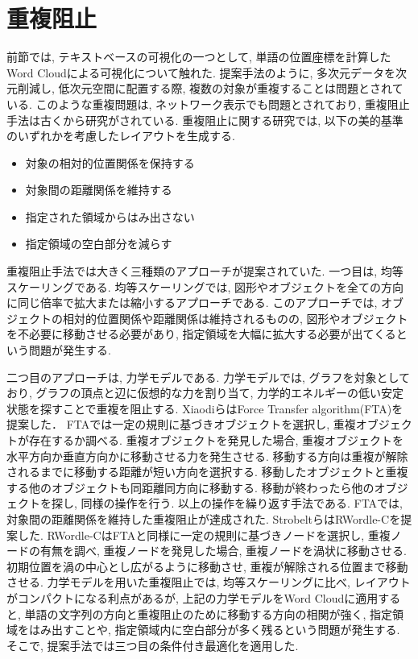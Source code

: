 \documentclass[syuuron]{kuee}
\begin{document}
	\section{重複阻止}
		前節では, テキストベースの可視化の一つとして, 単語の位置座標を計算したWord Cloudによる可視化について触れた. 
		提案手法のように, 多次元データを次元削減し, 低次元空間に配置する際, 複数の対象が重複することは問題とされている. 
		このような重複問題は, ネットワーク表示でも問題とされており, 重複阻止手法は古くから研究がされている. 
		重複阻止に関する研究では, 以下の美的基準のいずれかを考慮したレイアウトを生成する. 
		\begin{itemize}
			\item 対象の相対的位置関係を保持する
			\item 対象間の距離関係を維持する
			\item 指定された領域からはみ出さない
			\item 指定領域の空白部分を減らす
		\end{itemize}
		
		重複阻止手法では大きく三種類のアプローチが提案されていた. 
		一つ目は, 均等スケーリングである. 均等スケーリングでは, 図形やオブジェクトを全ての方向に同じ倍率で拡大または縮小するアプローチである\cite{fsa1}. 
		このアプローチでは, オブジェクトの相対的位置関係や距離関係は維持されるものの, 図形やオブジェクトを不必要に移動させる必要があり, 
		指定領域を大幅に拡大する必要が出てくるという問題が発生する. 
		
		二つ目のアプローチは, 力学モデルである. 
		力学モデルでは, グラフを対象としており, グラフの頂点と辺に仮想的な力を割り当て, 力学的エネルギーの低い安定状態を探すことで重複を阻止する. 
		XiaodiらはForce Transfer algorithm(FTA)を提案した\cite{fta1}．
		FTAでは一定の規則に基づきオブジェクトを選択し, 重複オブジェクトが存在するか調べる. 
		重複オブジェクトを発見した場合, 重複オブジェクトを水平方向か垂直方向かに移動させる力を発生させる. 
		移動する方向は重複が解除されるまでに移動する距離が短い方向を選択する. 移動したオブジェクトと重複する他のオブジェクトも同距離同方向に移動する. 
		移動が終わったら他のオブジェクトを探し, 同様の操作を行う. 以上の操作を繰り返す手法である. 
		FTAでは, 対象間の距離関係を維持した重複阻止が達成された. 
		StrobeltらはRWordle-Cを提案した\cite{rwc1}. 
		RWordle-CはFTAと同様に一定の規則に基づきノードを選択し, 重複ノードの有無を調べ, 
		重複ノードを発見した場合, 重複ノードを渦状に移動させる. 初期位置を渦の中心とし広がるように移動させ, 重複が解除される位置まで移動させる. 
		力学モデルを用いた重複阻止では, 均等スケーリングに比べ, レイアウトがコンパクトになる利点があるが, 
		上記の力学モデルをWord Cloudに適用すると, 単語の文字列の方向と重複阻止のために移動する方向の相関が強く, 
		指定領域をはみ出すことや, 指定領域内に空白部分が多く残るという問題が発生する. 
		そこで, 提案手法では三つ目の条件付き最適化を適用した. 
		
\end{document}

